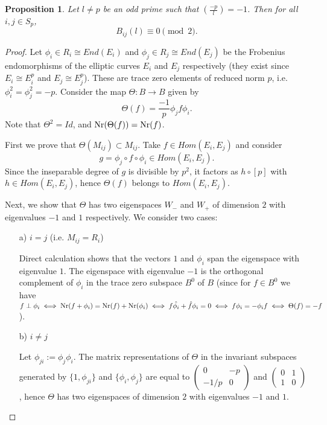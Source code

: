 \documentclass[13pt]{amsart}
\newtheorem{proposition}[theorem]{Proposition}
\theoremstyle{remark}
\numberwithin{theorem}{section} \numberwithin{equation}{section}
\begin{document}
\begin{proposition}\label{prop:even} Let $l\ne p$ be an odd prime such that $\left(\frac{-p}{l}\right)= -1$.
Then for all $i,j \in S_p$,
\[
B_{ij}(l) \equiv 0 \pmod{2}.
\]
\end{proposition}
\begin{proof}
Let $\phi_i\in R_i \cong End(E_i)$ and $\phi_j \in R_j\cong End(E_j)$ be the Frobenius endomorphisms of the elliptic curves $E_i$ and $E_j$ respectively  (they exist since $E_i \cong E_i^{p}$ and $E_j \cong E_j^{p}$). These are trace zero elements of reduced norm $p$, i.e. $\phi_i^2=\phi_j^2=-p$. Consider the map $\Theta: B \rightarrow B$ given by
\[
\Theta(f) = \frac{-1}{p}\phi_j f \phi_i.
\]
Note that $\Theta^2=Id$, and ${\rm Nr}(\Theta(f))={\rm Nr}(f)$.

First we prove that $\Theta(M_{ij})\subset M_{ij}$. Take $f\in Hom(E_i, E_j)$ and consider 
\[ g=\phi_j\circ f \circ \phi_i \in Hom(E_i, E_j).\] Since the inseparable degree of $g$ is divisible by $p^2$, it factors as $h\circ [p]$ with $h\in Hom(E_i, E_j)$,
hence $\Theta(f)$ belongs to $Hom(E_i, E_j)$.

Next, we show that $\Theta$ has two eigenspaces $W_-$ and $W_+$ of dimension $2$ with eigenvalues $-1$ and $1$ respectively. We consider two cases:

\begin{itemize}
\item [a)] $i=j$ (i.e. $M_{ij}=R_i$)
	
\noindent Direct calculation shows that the vectors $1$ and $\phi_i$ span the 
eigenspace with eigenvalue $1$. The eigenspace with eigenvalue $-1$ is the 
orthogonal complement of $\phi_i$ in the trace zero subspace $B^{0}$ of $B$ 
(since for $f \in B^{0}$ we have $f \perp \phi_i \iff 
{\rm Nr}(f+\phi_i)={\rm Nr}(f)+{\rm Nr}(\phi_i) \iff f \hat{\phi_i}+\hat{f} \phi_i=0 \iff 
f\phi_i = -\phi_i f \iff \Theta(f)=-f$).
\item[b)] $i \ne j$
	
\noindent Let $\phi_{ji}:= \phi_j \phi_i$. The matrix representations of $\Theta$ in the invariant subspaces generated by $\{ 1, \phi_{ji}\}$ and $\{ \phi_i, \phi_j \}$ are equal to ${\left(\begin{smallmatrix}0&{-p}\\ {-1/p}&0 \end{smallmatrix}
\right)}$ and ${\left(\begin{smallmatrix}0&{1}\\ {1}&0 \end{smallmatrix}
\right)}$, hence  $\Theta$ has two eigenspaces of dimension $2$ with eigenvalues $-1$ and $1$.
\end{itemize}


\end{proof}
\end{document}
